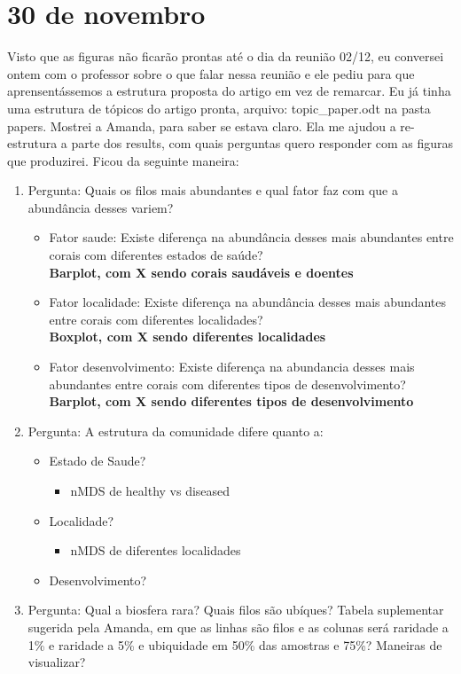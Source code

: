 \documentclass[12pt, a4paper]{report}
\begin{document}
\section{30 de novembro}
Visto que as figuras não ficarão prontas até o dia da reunião 02/12, eu conversei ontem com o professor sobre o que falar nessa reunião e ele pediu para que aprensentássemos a estrutura proposta do artigo em vez de remarcar. Eu já tinha uma estrutura de tópicos do artigo pronta, arquivo: topic\_paper.odt na pasta papers. Mostrei a Amanda, para saber se estava claro. Ela me ajudou a re-estrutura a parte dos results, com quais perguntas quero responder com as figuras que produzirei. Ficou da seguinte maneira:\\

\begin{enumerate}
\item Pergunta: Quais os filos mais abundantes e qual fator faz com que a abundância desses variem? 
	\begin{itemize}
	\item Fator saude: Existe diferença na abundância desses mais abundantes entre corais com diferentes estados de saúde?\\
	\textbf{Barplot, com X sendo corais saudáveis e doentes}
	\item Fator localidade: Existe diferença na abundância desses mais abundantes entre corais com diferentes localidades?\\
	\textbf{Boxplot, com X sendo diferentes localidades}
	\item Fator desenvolvimento: Existe diferença na abundancia desses mais abundantes entre corais com diferentes tipos de desenvolvimento?\\
	\textbf{Barplot, com X sendo diferentes tipos de desenvolvimento}
	\end{itemize}
\item Pergunta: A estrutura da comunidade difere quanto a:
	\begin{itemize}
	\item Estado de Saude?
		\begin{itemize}
		\item nMDS de healthy vs diseased
		\end{itemize}
	\item Localidade? 
		\begin{itemize}
		\item nMDS de diferentes localidades
		\end{itemize}
	\item Desenvolvimento?
	\end{itemize}
\item Pergunta: Qual a biosfera rara? Quais filos são ubíques?
Tabela suplementar sugerida pela Amanda, em que as linhas são filos e as colunas será raridade a 1\% e raridade a 5\% e ubiquidade em 50\% das amostras e 75\%? 
Maneiras de visualizar?
\end{enumerate}

 
 



 
\end{document}

